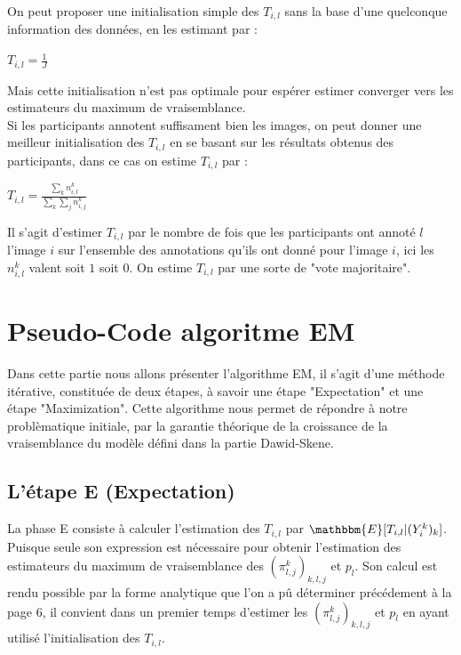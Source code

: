 \documentclass[frenchb]{report}
\newcommand{\1}{\mathbbm{1}}
\newcommand{\E}{\mathbbm{E}}
\theoremstyle{definition}\newtheorem{defn}{Définition}
\theoremstyle{definition}\newtheorem{exm}{Exemple}
\theoremstyle{definition}\newtheorem{nota}{Notation}
\theoremstyle{definition}\newtheorem{rem}{Remarque}
\begin{document}
On peut proposer une initialisation simple des  $T_{i,l}$ sans la base d'une quelconque information des données, en les estimant par : 

\begin{center}
	$T_{i,l} = \displaystyle \frac{1}{J}$
\end{center}

Mais cette initialisation n'est pas optimale pour espérer estimer converger vers les estimateurs du maximum de vraisemblance.\\

Si les participants annotent suffisament bien les images, on peut donner une meilleur initialisation des $T_{i,l}$ en se basant sur les résultats obtenus des participants, dans ce cas on estime $T_{i,l}$ par : 

\begin{center}
	 $T_{i,l} = \displaystyle \frac{ \displaystyle \sum_k n_{i,l}^k}{\displaystyle \sum_k \displaystyle \sum_j n_{i,j}^k}$
\end{center}

Il s'agit d'estimer $T_{i,l}$ par le nombre de fois que les participants ont annoté $l$ l'image $i$ sur l'ensemble des annotations qu'ils ont donné pour l'image $i$, ici les $n_{i,l}^k$ valent soit $1$ soit $0$. On estime $T_{i,l}$ par une sorte de "vote majoritaire".

\chapter{Pseudo-Code algoritme EM}

Dans cette partie nous allons présenter l'algorithme EM, il s'agit d'une méthode itérative, constituée de deux étapes, à savoir une étape "Expectation" et une étape "Maximization". Cette algorithme nous permet de répondre à notre problèmatique initiale, par la garantie théorique de la croissance de la vraisemblance du modèle défini dans la partie Dawid-Skene.

\section{L'étape E (Expectation)}

La phase E consiste à calculer l'estimation des $T_{i,l}$ par $\E[T_{i,l}|(Y^k_i)_k]$.\\
Puisque seule son expression est nécessaire pour obtenir l'estimation des estimateurs du maximum de vraisemblance des $(\pi^k_{l,j})_{k,l,j}$ et $p_l$. Son calcul est rendu possible par la forme analytique que l'on a pû déterminer précédement à la page $6$, il convient dans un premier temps d'estimer les $(\pi^k_{l,j})_{k,l,j}$ et $p_l$ en ayant utilisé l'initialisation des $T_{i,l}$.
\end{document}
